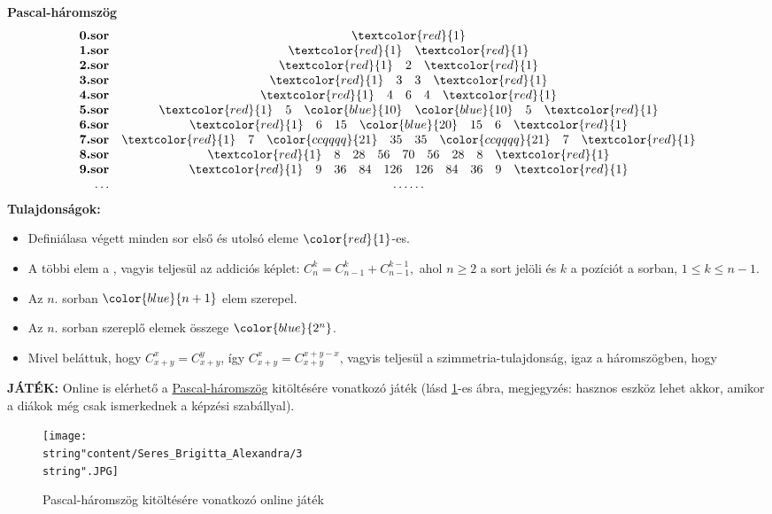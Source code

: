 \textbf{Pascal-háromszög} 
\[
\begin{array}{rc}
\textbf{0.sor} & \textcolor{red}{1}\\
\textbf{1.sor} & \textcolor{red}{1}\quad\textcolor{red}{1}\\
\textbf{2.sor} & \textcolor{red}{1}\quad2\quad\textcolor{red}{1}\\
\textbf{3.sor} & \textcolor{red}{1}\quad3\quad3\quad\textcolor{red}{1}\\
\textbf{4.sor} & \textcolor{red}{1}\quad4\quad6\quad4\quad\textcolor{red}{1}\\
\textbf{5.sor} & \textcolor{red}{1}\quad5\quad{\color{blue}{10}}\quad{\color{blue}{10}}\quad5\quad\textcolor{red}{1}\\
\textbf{6.sor} & \textcolor{red}{1}\quad6\quad15\quad{\color{blue}{20}}\quad15\quad6\quad\textcolor{red}{1}\\
\textbf{7.sor} & \textcolor{red}{1}\quad7\quad{\color{ccqqqq}{21}}\quad35\quad35\quad{\color{ccqqqq}{21}}\quad7\quad\textcolor{red}{1}\\
\textbf{8.sor} & \textcolor{red}{1}\quad8\quad28\quad56\quad70\quad56\quad28\quad8\quad\textcolor{red}{1}\\
\textbf{9.sor} & \textcolor{red}{1}\quad9\quad36\quad84\quad126\quad126\quad84\quad36\quad9\quad\textcolor{red}{1}\\
\ldots & \ldots\ldots
\end{array}
\]
\textbf{Tulajdonságok:} 
\begin{itemize}
\item Definiálasa végett minden sor első és utolsó eleme ${\color{red}{1}}$-es. 
\item A többi elem a {\color{blue}{fölötte álló két szám összege}},
vagyis teljesül az addiciós képlet: $C_{n}^{k}=C_{n-1}^{k}+C_{n-1}^{k-1},$
ahol $n\geq2$ a sort jelöli és $k$ a pozíciót a sorban, $1\leq k\leq n-1$. 
\item Az $n.$ sorban ${\color{blue}{n+1}}$ elem szerepel. 
\item Az $n.$ sorban szereplő elemek összege ${\color{blue}{2^{n}}}$. 
\item Mivel beláttuk, hogy $C_{x+y}^{x}=C_{x+y}^{y}$, így $C_{x+y}^{x}=C_{x+y}^{x+y-x}$,
vagyis teljesül a szimmetria-tulajdonság, igaz a háromszögben, hogy
{\color{ccqqqq}{a szélektől egyforma távolságra levő számok egymással
egyenlőek.}} 
\end{itemize}
\vspace{0.3cm}

\textbf{JÁTÉK:} Online is elérhető a \textcolor{blue}{\href{https://mathigon.org/course/sequences/pascals-triangle?fbclid=IwY2xjawJSNH1leHRuA2FlbQIxMAABHdKs5VH-uPr_MrJXtm5Bt0-Ima86B7AqARyf5XoyXEeBA_tXzXkG7Vf2Lw_aem_hVcotl8kGh-BhOqF5w-W4g}{Pascal-h\' aromsz\" og}}
kitöltésére vonatkozó játék (lásd \ref{7sb2}-es ábra, megjegyzés:
hasznos eszköz lehet akkor, amikor a diákok még csak ismerkednek a
képzési szabállyal). 
\begin{figure}[h]
\centering \texttt{[image: \\string"content/Seres\_Brigitta\_Alexandra/3\\string".JPG]}
\caption{Pascal-háromszög kitöltésére vonatkozó online játék}
\label{7sb2}
\end{figure}

